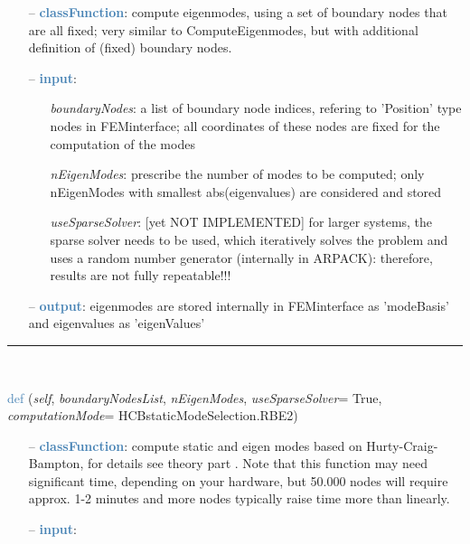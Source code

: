 \begin{itemize}[leftmargin=1.4cm]
\begin{itemize}[leftmargin=0.5cm]
\begin{itemize}[leftmargin=1.4cm]
\begin{itemize}[leftmargin=1.4cm]
\begin{itemize}[leftmargin=0.5cm]
\begin{flushleft}
\end{flushleft}
\setlength{\itemindent}{0.7cm}
\begin{itemize}[leftmargin=0.7cm]
  \item[--]  \textcolor{steelblue}{\bf classFunction}: compute eigenmodes, using a set of boundary nodes that are all fixed; very similar to ComputeEigenmodes, but with additional definition of (fixed) boundary nodes.  \item[--]  \textcolor{steelblue}{\bf input}: \vspace{-6pt}
  \begin{itemize}[leftmargin=1.2cm]
\setlength{\itemindent}{-0.7cm}
    \item[] {\it boundaryNodes}: a list of boundary node indices, refering to 'Position' type nodes in FEMinterface; all coordinates of these nodes are fixed for the computation of the modes
    \item[] {\it   nEigenModes}: prescribe the number of modes to be computed; only nEigenModes with smallest abs(eigenvalues) are considered and stored
    \item[] {\it   useSparseSolver}: [yet NOT IMPLEMENTED] for larger systems, the sparse solver needs to be used, which iteratively solves the problem and uses a random number generator (internally in ARPACK): therefore, results are not fully repeatable!!!
  \end{itemize}
  \item[--]  \textcolor{steelblue}{\bf output}: eigenmodes are stored internally in FEMinterface as 'modeBasis' and eigenvalues as 'eigenValues'\vspace{12pt}\end{itemize}
%
\noindent\rule{8cm}{0.75pt}\vspace{1pt} \\ 
\begin{flushleft}
\noindent \textcolor{steelblue}{def {\bf {}}}\label{sec:FEM:FEMinterface:ComputeHurtyCraigBamptonModes}
({\it self}, {\it boundaryNodesList}, {\it nEigenModes}, {\it useSparseSolver}= True, {\it computationMode}= HCBstaticModeSelection.RBE2)
\end{flushleft}
\setlength{\itemindent}{0.7cm}
\begin{itemize}[leftmargin=0.7cm]
  \item[--]  \textcolor{steelblue}{\bf classFunction}: compute static  and eigen modes based on Hurty-Craig-Bampton, for details see theory part . Note that this function may need significant time, depending on your hardware, but 50.000 nodes will require approx. 1-2 minutes and more nodes typically raise time more than linearly.  \item[--]  \textcolor{steelblue}{\bf input}: \vspace{-6pt}

\end{itemize}
\end{itemize}
\end{itemize}
\end{itemize}
\end{itemize}
\end{itemize}
